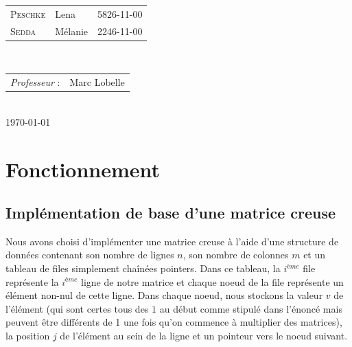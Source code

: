 \documentclass[12pt,a4paper]{article}
\begin{document}
\begin{titlepage}
\large 
{\begin{tabular}{lll}
\textsc{Peschke} & Lena & 5826-11-00\\
\textsc{Sedda} & Mélanie & 2246-11-00\\
\end{tabular}}
\\[1cm]

\normalsize
{\begin{tabular}{ll}
\textit{Professeur} : & Marc Lobelle \\
\end{tabular}}
\\[1cm]


{\normalsize \today}\\[3cm] %

\newpage

\end{titlepage}


\clearpage
\thispagestyle{empty}
\tableofcontents
\clearpage
{}


\section{Fonctionnement}


\subsection{Implémentation de base d'une matrice creuse}
Nous avons choisi d'implémenter une matrice creuse à l'aide d'une structure de données contenant son nombre de lignes $n$, son nombre de colonnes $m$ et un tableau de files simplement chaînées pointers. Dans ce tableau, la $i^{ème}$ file représente la  $i^{ème}$ ligne de notre matrice et chaque noeud de la file représente un élément non-nul de cette ligne. Dans chaque noeud, nous stockons la valeur $v$ de l'élément (qui sont certes tous des $1$ au début comme stipulé dans l'énoncé mais peuvent être différents de 1 une fois qu'on commence à multiplier des matrices), la position $j$ de l'élément au sein de la ligne et un pointeur vers le noeud suivant.\\
\end{document}
